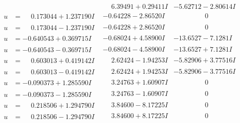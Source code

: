 \documentclass[1p]{elsarticle_modified}
\theoremstyle{definition}
\begin{document}
$$\begin{array}{c|c|c}
 & \phantom{-}6.39491 + 0.29411 I & -5.62712 - 2.80614 I \\ \hline\begin{aligned}
u &= \phantom{-}0.173044 + 1.237190 I\end{aligned}
 & -0.64228 - 2.86520 I & \phantom{-0.000000 } 0 \\ \hline\begin{aligned}
u &= \phantom{-}0.173044 - 1.237190 I\end{aligned}
 & -0.64228 + 2.86520 I & \phantom{-0.000000 } 0 \\ \hline\begin{aligned}
u &= -0.640543 + 0.369715 I\end{aligned}
 & -0.68024 + 4.58900 I & -13.6527 - 7.1281 I \\ \hline\begin{aligned}
u &= -0.640543 - 0.369715 I\end{aligned}
 & -0.68024 - 4.58900 I & -13.6527 + 7.1281 I \\ \hline\begin{aligned}
u &= \phantom{-}0.603013 + 0.419142 I\end{aligned}
 & \phantom{-}2.62424 - 1.94253 I & -5.82906 + 3.77516 I \\ \hline\begin{aligned}
u &= \phantom{-}0.603013 - 0.419142 I\end{aligned}
 & \phantom{-}2.62424 + 1.94253 I & -5.82906 - 3.77516 I \\ \hline\begin{aligned}
u &= -0.090373 + 1.285590 I\end{aligned}
 & \phantom{-}3.24763 + 1.60907 I & \phantom{-0.000000 } 0 \\ \hline\begin{aligned}
u &= -0.090373 - 1.285590 I\end{aligned}
 & \phantom{-}3.24763 - 1.60907 I & \phantom{-0.000000 } 0 \\ \hline\begin{aligned}
u &= \phantom{-}0.218506 + 1.294790 I\end{aligned}
 & \phantom{-}3.84600 - 8.17225 I & \phantom{-0.000000 } 0 \\ \hline\begin{aligned}
u &= \phantom{-}0.218506 - 1.294790 I\end{aligned}
 & \phantom{-}3.84600 + 8.17225 I & \phantom{-0.000000 } 0 \\ \hline\begin{aligned}

\end{aligned}
\end{array}$$
\end{document}
